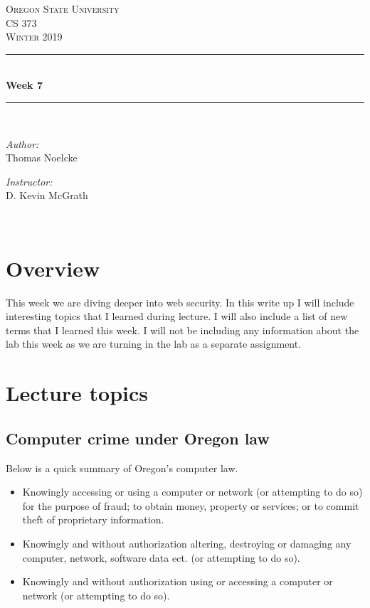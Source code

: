 \documentclass[letterpaper, onecolumn,10pt]{IEEEtran}
\begin{document}
    \begin{titlepage}
    \newcommand{\HRule}{\rule{\linewidth}{0.5mm}}
    \center
    \textsc{\Large Oregon State University}\\[1.5cm]
    \textsc{\Large CS 373}\\[0.5cm]
    \textsc{\Large Winter 2019}\\[0.5cm]
    \HRule \\[0.4cm]
    { \huge \bfseries Week 7}\\[0.4cm] %
    \HRule \\[1.5cm]
    \begin{minipage}{0.4\textwidth}
        \begin{flushleft} \large
        \emph{Author:}\\
        Thomas Noelcke
        \end{flushleft}
    \end{minipage}
    \begin{minipage}{0.4\textwidth}
        \begin{flushright} \large
        \emph{Instructor:} \\
        D. Kevin McGrath\\
        \end{flushright}
    \end{minipage}\\[2cm]
		\end{titlepage}
		
		
		\section{Overview}
		This week we are diving deeper into web security. In this write up I will include interesting topics that I learned during lecture. I will also include a list of new terms that I learned this week. I will not be including any information about the lab this week as we are turning in the lab as a separate assignment.\\
			
		\section{Lecture topics}
		    \subsection{Computer crime under Oregon law}
		    Below is a quick summary of Oregon's computer law.
		        \begin{itemize}
		            \item Knowingly accessing or using a computer or network (or attempting to do so) for the purpose of fraud; to obtain money, property or services; or to commit theft of proprietary information.
		            \item Knowingly and without authorization altering, destroying or damaging any computer, network, software data ect. (or attempting to do so).
		            \item Knowingly and without authorization using or accessing a computer or network (or attempting to do so).
		        \end{itemize}
		        
\end{document}
